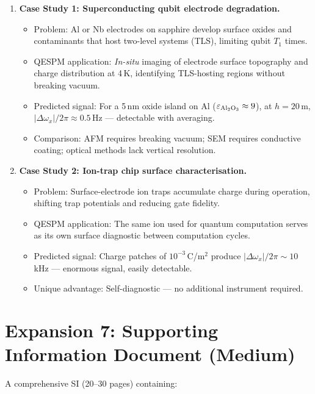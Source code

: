 \documentclass[11pt,a4paper]{article}
\begin{document}
\begin{enumerate}[label=\textbf{C\arabic*}, leftmargin=*]

    \item \textbf{Case Study 1: Superconducting qubit electrode degradation.}
    \begin{itemize}
        \item Problem: Al or Nb electrodes on sapphire develop surface oxides and contaminants that host two-level systems (TLS), limiting qubit $T_1$ times.
        \item QESPM application: \emph{In-situ} imaging of electrode surface topography and charge distribution at 4\,K, identifying TLS-hosting regions without breaking vacuum.
        \item Predicted signal: For a 5\,nm oxide island on Al ($\varepsilon_{\rm Al_2O_3} \approx 9$), at $h = 20$\,\textmu m, $|\Delta\omega_x|/2\pi \approx 0.5$\,Hz --- detectable with averaging.
        \item Comparison: AFM requires breaking vacuum; SEM requires conductive coating; optical methods lack vertical resolution.
    \end{itemize}

    \item \textbf{Case Study 2: Ion-trap chip surface characterisation.}
    \begin{itemize}
        \item Problem: Surface-electrode ion traps accumulate charge during operation, shifting trap potentials and reducing gate fidelity.
        \item QESPM application: The same ion used for quantum computation serves as its own surface diagnostic between computation cycles.
        \item Predicted signal: Charge patches of $10^{-3}$\,C/m$^2$ produce $|\Delta\omega_x|/2\pi \sim 10$\,kHz --- enormous signal, easily detectable.
        \item Unique advantage: Self-diagnostic --- no additional instrument required.
    \end{itemize}
\end{enumerate}

\section{Expansion 7: Supporting Information Document (Medium)}

A comprehensive SI (20--30 pages) containing:
\end{document}
